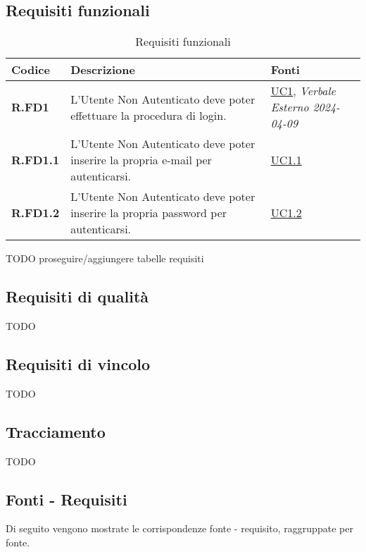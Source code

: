 \subsection{Requisiti funzionali}
\begin{table}[H]
\begin{center}
  \begin{longtable}{|P{3cm}|P{6,5cm}|>{\arraybackslash}P{4cm}|}
    \hline
    \textbf{Codice} & \textbf{Descrizione} & \textbf{Fonti} \\
    \hline 
    
    \textbf{R.FD1} & L’Utente Non Autenticato deve poter effettuare la procedura di login. &  \hyperref[UC1]{UC1}, \emph{Verbale Esterno 2024-04-09}\\
    \hline \textbf{R.FD1.1} & L’Utente Non Autenticato deve poter inserire la propria e-mail per autenticarsi. & \hyperref[UC1point1]{UC1.1}\\
    \hline \textbf{R.FD1.2} & L’Utente Non Autenticato deve poter inserire la propria password per autenticarsi. & \hyperref[UC1point2]{UC1.2}\\
    \hline
  \end{longtable}
\end{center}
\caption{Requisiti funzionali}
\label{requisitifunzionali}
\end{table}

TODO proseguire/aggiungere tabelle requisiti

\subsection{Requisiti di qualità}
TODO

\subsection{Requisiti di vincolo}
TODO

\subsection{Tracciamento}
TODO

\subsection{Fonti - Requisiti}
Di seguito vengono mostrate le corrispondenze fonte - requisito, raggruppate per fonte.

